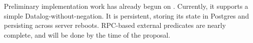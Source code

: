 \section{\sysname}
Preliminary implementation work has already begun on \sysname.
Currently, it supports a simple Datalog-without-negation.
It is persistent, storing its state in Postgres and persisting across server reboots.
RPC-based external predicates are nearly complete, and will be done by the time of the proposal.
